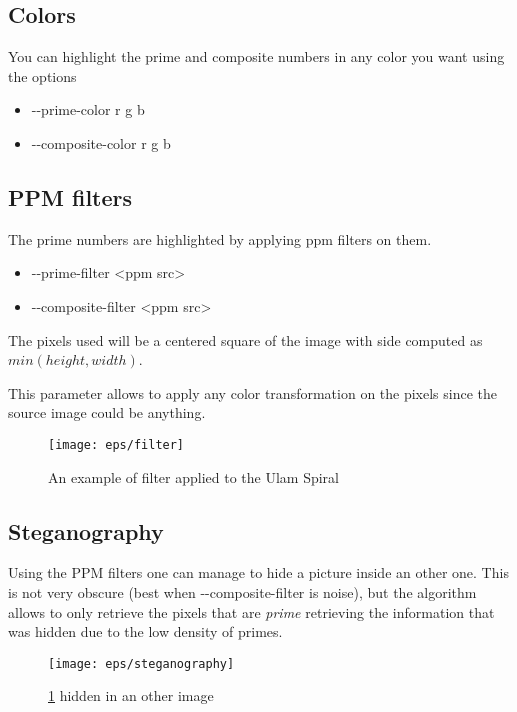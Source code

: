 \subsection{Colors}
You can highlight the prime and composite numbers in any color you want using the options

\begin{itemize}
	\item{-{}-prime-color r g b}
	\item{-{}-composite-color r g b}
\end{itemize}

\subsection{PPM filters}
The prime numbers are highlighted by applying ppm filters on them.

\begin{itemize}
	\item{-{}-prime-filter <ppm src>}
	\item{-{}-composite-filter <ppm src>}
\end{itemize}

The pixels used will be a centered square of the image with side computed as $min(height, width)$.

This parameter allows to apply any color transformation on the pixels since the source image could be anything.

\begin{figure}
	\centering
	\texttt{[image: eps/filter]}
	\caption{\label{fig:repr:1} An example of filter applied to the Ulam Spiral}
\end{figure}


\subsection{Steganography}
Using the PPM filters one can manage to hide a picture inside an other one. This is not very obscure (best when -{}-composite-filter is noise), but the algorithm allows to only retrieve the pixels that are \emph{prime} retrieving the information that was hidden due to the low density of primes.


\begin{figure}
	\centering
	\texttt{[image: eps/steganography]}
	\caption{\label{fig:repr:2} \ref{fig:repr:1} hidden in an other image}
\end{figure}
